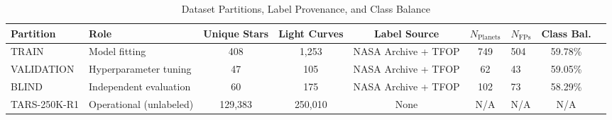 \begin{table}[htbp]
\centering
\caption{Dataset Partitions, Label Provenance, and Class Balance}
\label{tab:dataset_overview}
\begin{tabular}{llcccclcc}
\hline\hline
Partition & Role & Unique Stars & Light Curves & Label Source & $N_{\text{Planets}}$ & $N_{\text{FPs}}$ & Class Bal. \\
\hline
TRAIN & Model fitting & 408 & 1,253 & NASA Archive + TFOP & 749 & 504 & 59.78\% \\
VALIDATION & Hyperparameter tuning & 47 & 105 & NASA Archive + TFOP & 62 & 43 & 59.05\% \\
BLIND & Independent evaluation & 60 & 175 & NASA Archive + TFOP & 102 & 73 & 58.29\% \\
\hline
TARS-250K-R1 & Operational (unlabeled) & 129,383 & 250,010 & None & N/A & N/A & N/A \\
\hline
\end{tabular}
\end{table}
